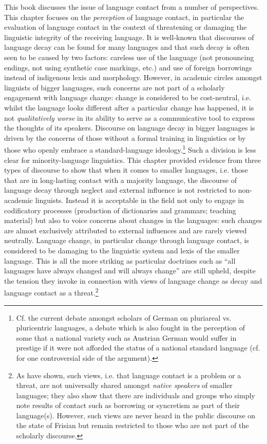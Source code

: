 \documentclass[output=paper]{langsci/langscibook}
\begin{document}
This book discusses the issue of language contact from a number of perspectives. This chapter focuses on the \textit{perception} of language contact, in particular the evaluation of language contact in the context of threatening or damaging the linguistic integrity of the receiving language. It is well-known that discourses of language decay can be found for many languages and that such decay is often seen to be caused by two factors: careless use of the language (not pronouncing endings, not using synthetic case markings, etc.) and use of foreign borrowings instead of indigenous lexis and morphology. However, in academic circles amongst linguists of bigger languages, such concerns are not part of a scholarly engagement with language change: change is considered to be cost-neutral, i.e. whilst the language looks different after a particular change has happened, it is not \textit{qualitatively worse} in its ability to serve as a communicative tool to express the thoughts of its speakers. Discourse on language decay in bigger languages is driven by the concerns of those without a formal training in linguistics or by those who openly embrace a standard-language ideology.\footnote{Cf. the current debate amongst scholars of German on pluriareal vs. pluricentric languages, a debate which is also fought in the perception of some that a national variety such as Austrian German would suffer in prestige if it were not afforded the status of a national standard language (cf. \citealt{Dollinger2019} for one controversial side of the argument).} Such a division is less clear for minority-language linguistics. This chapter provided evidence from three types of discourse to show that when it comes to smaller languages, i.e. those that are in long-lasting contact with a majority language, the discourse of language decay through neglect and external influence is not restricted to non-academic linguists. Instead it is acceptable in the field not only to engage in codificatory processes (production of dictionaries and grammars; teaching material) but also to voice concerns about changes in the languages: such changes are almost exclusively attributed to external influences and are rarely viewed neutrally. Language change, in particular change through language contact, is considered to be damaging to the linguistic system and lexis of the smaller language. This is all the more striking as particular doctrines such as “all languages have always changed and will always change” are still upheld, despite the tension they invoke in connection with views of language change as decay and language contact as a threat.\footnote{As \citet{AdmiraalEtAL2019} have shown, such views, i.e. that language contact is a problem or a threat, are not universally shared amongst \textit{native speakers} of smaller languages; they also show that there are individuals and groups who simply note results of contact such as borrowing or syncretism as part of their language(s). However, such views are never heard in the public discourse on the state of Frisian but remain restricted to those who are not part of the scholarly discourse.}
\end{document}
